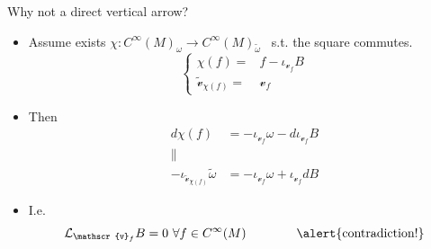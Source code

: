 \documentclass[10pt]{beamer}
\providecommand{\vHam}{\mathscr{v}}
\begin{document}
\begin{frame}[fragile]{Why not a direct vertical arrow?}\label{frame:whyNoVertArrow}
	\begin{center}
			
	\end{center}
	\vfill
	\begin{itemize}
		\item<2-> Assume exists \alert<2>{$\chi:C^\infty(M)_\omega \to C^\infty(M)_{\widetilde{\omega}}$} ~s.t. the square commutes.
				\begin{displaymath}
					\begin{cases}
						\chi(f) =& f - \iota_{\vHam_f} B
						\\
						\widetilde{\vHam}_{\chi(f)} =& \vHam_f
					\end{cases}
				\end{displaymath}
		\item<3-> Then
			\begin{align*}
				d \chi(f) &= - \iota_{\vHam_f}\omega - d \iota_{\vHam_f} B \\
				\parallel & \\
				-\iota_{\widetilde{\vHam}_{\chi(f)}} \widetilde{\omega} &= -\iota_{\vHam_f} \omega + \iota_{\vHam_f} d B
			\end{align*}
		\item<4-> I.e. $$\mathcal{L}_{\vHam_f} B = 0 ~ \forall f \in C^\infty(M) \qquad \qquad \text{\alert{contradiction!}}$$
	\end{itemize}
	\hfill {}%
\end{frame}
\end{document}
